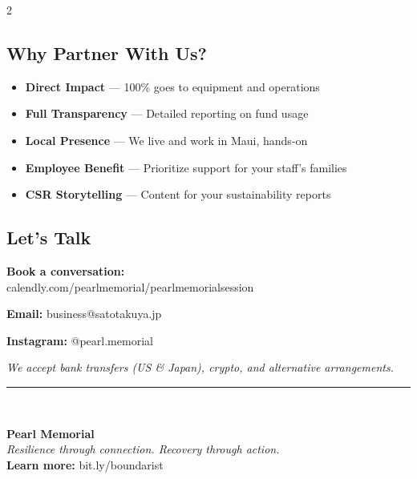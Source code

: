 \documentclass[9pt,a4paper]{article}
\begin{document}
\begin{multicols}{2}
\subsection*{Why Partner With Us?}
\begin{itemize}
\item \textbf{Direct Impact} — 100\% goes to equipment and operations
\item \textbf{Full Transparency} — Detailed reporting on fund usage
\item \textbf{Local Presence} — We live and work in Maui, hands-on
\item \textbf{Employee Benefit} — Prioritize support for your staff's families
\item \textbf{CSR Storytelling} — Content for your sustainability reports
\end{itemize}

\subsection*{Let's Talk}
\textbf{Book a conversation:}\\
calendly.com/pearlmemorial/pearlmemorialsession

\textbf{Email:} business@satotakuya.jp

\textbf{Instagram:} @pearl.memorial

\vspace{6pt}
\textit{We accept bank transfers (US \& Japan), crypto, and alternative arrangements.}

\end{multicols}

\vspace{6pt}
\begin{center}
\rule{0.8\textwidth}{0.4pt}\\[8pt]
\begin{minipage}[c]{0.65\textwidth}
\centering
{\large \textbf{Pearl Memorial}}\\[3pt]
\textit{Resilience through connection. Recovery through action.}\\[6pt]
\textbf{Learn more:} bit.ly/boundarist
\end{minipage}%
\begin{minipage}[c]{0.25\textwidth}
\centering
{}
\end{minipage}
\end{center}
\end{document}
